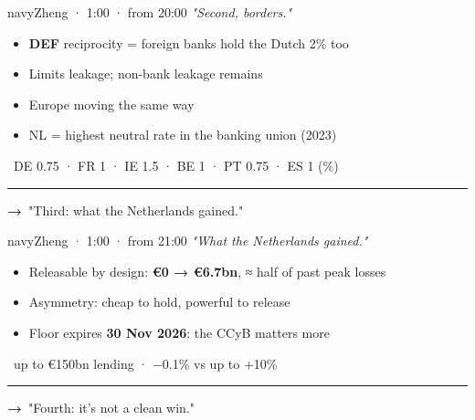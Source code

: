 \documentclass[10pt]{article}
\begin{document}
\begin{card}{navy}{\hfill{\normalsize\mdseries Zheng · 1:00 · from 20:00}}
{\large\itshape "Second, borders."}\par\smallskip
\begin{itemize}[label=\textcolor{navy}{\textbullet}]\item \textcolor{gold!80!black}{\textbf{DEF}} reciprocity = foreign banks hold the Dutch 2\% too\item Limits leakage; non-bank leakage remains\item Europe moving the same way\item NL = highest neutral rate in the banking union (2023)\end{itemize}
\smallskip{\color{navy}\textbf{\#}}\ DE 0.75 · FR 1 · IE 1.5 · BE 1 · PT 0.75 · ES 1 (\%)\par
\vfill\textcolor{grey}{\rule{\linewidth}{0.3pt}}\par{\bfseries\color{navy}→}\ "Third: what the Netherlands gained."
\end{card}
\hfill
\begin{card}{navy}{\hfill{\normalsize\mdseries Zheng · 1:00 · from 21:00}}
{\large\itshape "What the Netherlands gained."}\par\smallskip
\begin{itemize}[label=\textcolor{navy}{\textbullet}]\item Releasable by design: \textbf{€0 → €6.7bn}, ≈ half of past peak losses\item Asymmetry: cheap to hold, powerful to release\item Floor expires \textbf{30 Nov 2026}: the CCyB matters more\end{itemize}
\smallskip{\color{navy}\textbf{\#}}\ up to €150bn lending · −0.1\% vs up to +10\%\par
\vfill\textcolor{grey}{\rule{\linewidth}{0.3pt}}\par{\bfseries\color{navy}→}\ "Fourth: it's not a clean win."
\end{card}

\newpage
\end{document}
